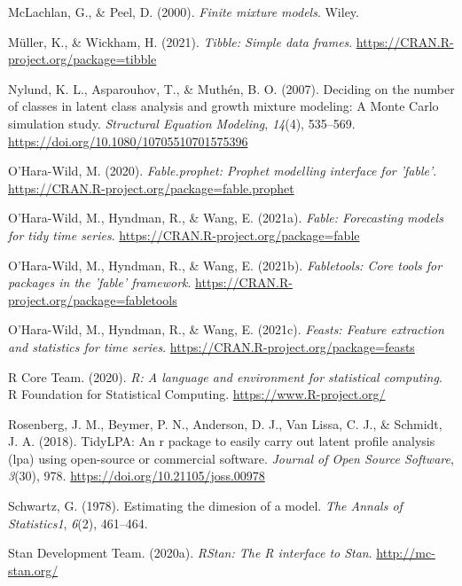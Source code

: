 \documentclass[
  english,
  man,floatsintext]{apa7}
\begin{document}
\leavevmode\hypertarget{ref-McLachlan2000}{}%
McLachlan, G., \& Peel, D. (2000). \emph{Finite mixture models}. Wiley.

\leavevmode\hypertarget{ref-R-tibble}{}%
Müller, K., \& Wickham, H. (2021). \emph{Tibble: Simple data frames}. \url{https://CRAN.R-project.org/package=tibble}

\leavevmode\hypertarget{ref-Nylund2007}{}%
Nylund, K. L., Asparouhov, T., \& Muthén, B. O. (2007). Deciding on the number of classes in latent class analysis and growth mixture modeling: A Monte Carlo simulation study. \emph{Structural Equation Modeling}, \emph{14}(4), 535--569. \url{https://doi.org/10.1080/10705510701575396}

\leavevmode\hypertarget{ref-R-fable.prophet}{}%
O'Hara-Wild, M. (2020). \emph{Fable.prophet: Prophet modelling interface for 'fable'}. \url{https://CRAN.R-project.org/package=fable.prophet}

\leavevmode\hypertarget{ref-R-fable}{}%
O'Hara-Wild, M., Hyndman, R., \& Wang, E. (2021a). \emph{Fable: Forecasting models for tidy time series}. \url{https://CRAN.R-project.org/package=fable}

\leavevmode\hypertarget{ref-R-fabletools}{}%
O'Hara-Wild, M., Hyndman, R., \& Wang, E. (2021b). \emph{Fabletools: Core tools for packages in the 'fable' framework}. \url{https://CRAN.R-project.org/package=fabletools}

\leavevmode\hypertarget{ref-R-feasts}{}%
O'Hara-Wild, M., Hyndman, R., \& Wang, E. (2021c). \emph{Feasts: Feature extraction and statistics for time series}. \url{https://CRAN.R-project.org/package=feasts}

\leavevmode\hypertarget{ref-R-base}{}%
R Core Team. (2020). \emph{R: A language and environment for statistical computing}. R Foundation for Statistical Computing. \url{https://www.R-project.org/}

\leavevmode\hypertarget{ref-R-tidyLPA}{}%
Rosenberg, J. M., Beymer, P. N., Anderson, D. J., Van Lissa, C. J., \& Schmidt, J. A. (2018). TidyLPA: An r package to easily carry out latent profile analysis (lpa) using open-source or commercial software. \emph{Journal of Open Source Software}, \emph{3}(30), 978. \url{https://doi.org/10.21105/joss.00978}

\leavevmode\hypertarget{ref-Schwartz1978}{}%
Schwartz, G. (1978). Estimating the dimesion of a model. \emph{The Annals of Statistics1}, \emph{6}(2), 461--464.

\leavevmode\hypertarget{ref-R-rstan}{}%
Stan Development Team. (2020a). \emph{RStan: The R interface to Stan}. \url{http://mc-stan.org/}
\end{document}
